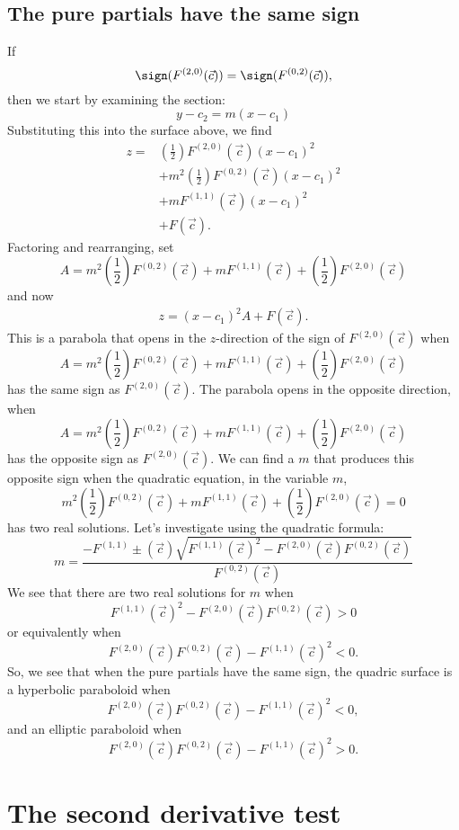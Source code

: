 \documentclass{ximera}
\begin{document}
\subsection{The pure partials have the same sign}
If 
\[
\sign(F^{(2,0)}(\vec{c})) = \sign(F^{(0,2)}(\vec{c})),
\]
then we start by examining the section:
\[
y -c_2 = m (x-c_1)
\]
Substituting this into the surface above, we find
\begin{align*}
  z = &\left(\frac{1}{2}\right)F^{(2,0)}(\vec{c})(x-c_1)^2\\
  &+ m^2 \left(\frac{1}{2}\right)F^{(0,2)}(\vec{c})(x-c_1)^2\\
  &+ m F^{(1,1)}(\vec{c}) (x-c_1)^2 \\
  &+ F(\vec{c}).
\end{align*}
Factoring and rearranging, set
\[
A = m^2 \left(\frac{1}{2}\right)F^{(0,2)}(\vec{c}) + m F^{(1,1)}(\vec{c}) + \left(\frac{1}{2}\right)F^{(2,0)}(\vec{c})
\]
and now 
\begin{align*}
z = (x-c_1)^2 A + F(\vec{c}).
\end{align*}
This is a parabola that opens in the $z$-direction of the sign of
$F^{(2,0)}(\vec{c})$ when
\[
A = m^2 \left(\frac{1}{2}\right)F^{(0,2)}(\vec{c}) + m F^{(1,1)}(\vec{c}) + \left(\frac{1}{2}\right)F^{(2,0)}(\vec{c})
\]
has the same sign as $F^{(2,0)}(\vec{c})$.  The parabola opens in the
opposite direction, when
\[
A = m^2 \left(\frac{1}{2}\right)F^{(0,2)}(\vec{c}) + m F^{(1,1)}(\vec{c}) + \left(\frac{1}{2}\right)F^{(2,0)}(\vec{c})
\]
has the opposite sign as $F^{(2,0)}(\vec{c})$.  We can find a $m$ that
produces this opposite sign when the quadratic equation, in the
variable $m$,
\[
m^2 \left(\frac{1}{2}\right)F^{(0,2)}(\vec{c}) + m F^{(1,1)}(\vec{c}) + \left(\frac{1}{2}\right)F^{(2,0)}(\vec{c}) = 0
\]
has two real solutions. Let's investigate using the quadratic formula:
\[
m = \frac{- F^{(1,1)}\pm(\vec{c})\sqrt{F^{(1,1)}(\vec{c})^2-F^{(2,0)}(\vec{c})F^{(0,2)}(\vec{c})}}{F^{(0,2)}(\vec{c})}
\]
We see that there are two real solutions for $m$ when
\[
F^{(1,1)}(\vec{c})^2-F^{(2,0)}(\vec{c})F^{(0,2)}(\vec{c})>0
\]
or equivalently when
\[
F^{(2,0)}(\vec{c})F^{(0,2)}(\vec{c})-F^{(1,1)}(\vec{c})^2<0.
\]
So, we see that when the pure partials have the same sign, the quadric
surface is a hyperbolic paraboloid when
\[
F^{(2,0)}(\vec{c})F^{(0,2)}(\vec{c})-F^{(1,1)}(\vec{c})^2<0,
\]
and an elliptic paraboloid when 
\[
F^{(2,0)}(\vec{c})F^{(0,2)}(\vec{c})-F^{(1,1)}(\vec{c})^2>0.
\]

\section{The second derivative test}
\end{document}
